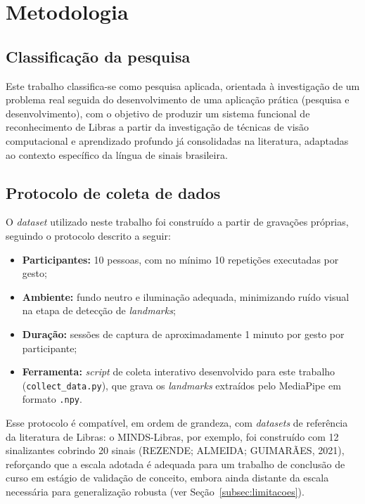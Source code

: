 \section{Metodologia}

\subsection{Classificação da pesquisa}

Este trabalho classifica-se como pesquisa aplicada, orientada à investigação de
um problema real seguida do desenvolvimento de uma aplicação prática (pesquisa e
desenvolvimento), com o objetivo de produzir um sistema funcional de
reconhecimento de Libras a partir da investigação de técnicas de visão
computacional e aprendizado profundo já consolidadas na literatura, adaptadas ao
contexto específico da língua de sinais brasileira.

\subsection{Protocolo de coleta de dados}
\label{subsec:coleta}

O \textit{dataset} utilizado neste trabalho foi construído a partir de gravações
próprias, seguindo o protocolo descrito a seguir:

\begin{itemize}[leftmargin=2cm]
  \item \textbf{Participantes:} 10 pessoas, com no mínimo 10 repetições
  executadas por gesto;
  \item \textbf{Ambiente:} fundo neutro e iluminação adequada, minimizando ruído
  visual na etapa de detecção de \textit{landmarks};
  \item \textbf{Duração:} sessões de captura de aproximadamente 1 minuto por
  gesto por participante;
  \item \textbf{Ferramenta:} \textit{script} de coleta interativo desenvolvido
  para este trabalho (\texttt{collect\_data.py}), que grava os \textit{landmarks}
  extraídos pelo MediaPipe em formato \texttt{.npy}.
\end{itemize}

Esse protocolo é compatível, em ordem de grandeza, com \textit{datasets} de
referência da literatura de Libras: o MINDS-Libras, por exemplo, foi construído
com 12 sinalizantes cobrindo 20 sinais (REZENDE; ALMEIDA; GUIMARÃES, 2021),
reforçando que a escala adotada é adequada para um trabalho de conclusão de curso
em estágio de validação de conceito, embora ainda distante da escala necessária
para generalização robusta (ver Seção~\ref{subsec:limitacoes}).

